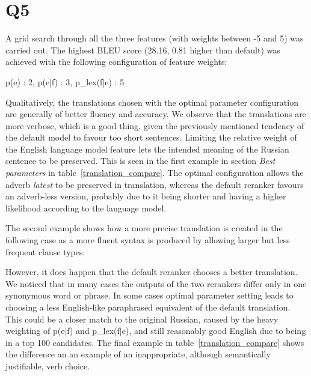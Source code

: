 \section*{Q5}

A grid search through all the three features (with weights between -5 and 5) was carried out. The highest BLEU score (28.16, 0.81 higher than default) was achieved with the following configuration of feature weights:

\centerline{p(e) : 2,    p(e|f) : 3,    p\_lex(f|e) : 5}

Qualitatively, the translations chosen with the optimal parameter configuration are generally of better fluency and accuracy. 
We observe that the translations are more verbose, which is a good thing, given the previously mentioned tendency of the default model to favour too short sentences. Limiting the relative weight of the English language model feature lets the intended meaning of the Russian sentence to be preserved. This is seen in the first example in section \textit{Best parameters} in table~\ref{translation_compare}. The optimal configuration allows the adverb \textit{latest} to be preserved in translation, whereas the default reranker favours an adverb-less version, probably due to it being shorter and having a higher likelihood according to the language model. 

The second example shows how a more precise translation is created in the following case as a more fluent syntax is produced by allowing larger but less frequent clause types.
   
However, it does happen that the default reranker chooses a better translation. We noticed that in many cases the outputs of the two rerankers differ only in one synonymous word or phrase. In some cases optimal parameter setting leads to choosing a less English-like paraphrased equivalent of the default translation. This could be a closer match to the original Russian, caused by the heavy weighting of p(e$|$f) and p\_lex(f$|$e), and still reasonably good English due to being in a top 100 candidates. The final example in table~\ref{translation_compare} shows the difference an an example of an inappropriate, although semantically justifiable, verb choice.